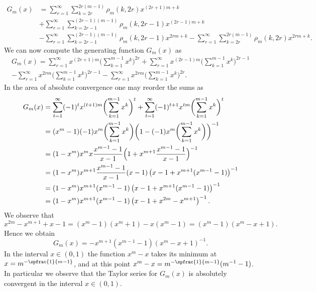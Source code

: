 \begin{equation*}
\begin{split}
G_m(x)&=\sum_{r=1}^{\infty} \sum_{k=2r}^{2r(m-1)}\rho_m(k,2r)x^{(2r+1)m+k}\\
&+ \sum_{r=1}^\infty\sum_{k=2r-1}^{(2r-1)(m-1)}\rho_m(k,2r-1)x^{(2r-1)m+k}\\
&-\sum_{r=1}^\infty \sum_{k=2r-1}^{(2r-1)(m-1)}\rho_m(k,2r-1)x^{2rm+k}-\sum_{r=1}^\infty\sum_{k=2r}^{2r(m-1)}\rho_m(k,2r)x^{2rm+k}.
\end{split}
\end{equation*}
We can now compute the generating function $G_m(x)$ as
\begin{multline*}
G_m(x)= \sum_{r=1}^{\infty} x^{(2r+1)m}\biggl(\sum_{k=1}^{m-1}x^k\biggr)^{2r}+ \sum_{r=1}^\infty x^{(2r-1)m}\biggl(\sum_{k=1}^{m-1}x^k\biggr)^{2r-1}\\
-\sum_{r=1}^\infty x^{2rm}\biggl(\sum_{k=1}^{m-1}x^k\biggr)^{2r-1} -\sum_{r=1}^\infty x^{2rm}\biggl(\sum_{k=1}^{m-1}x^k\biggr)^{2r}.
\end{multline*}
In the area of absolute convergence one may reorder the sums as
\begin{equation*}
\begin{split}
G_m(x)&=\sum_{t=1}^{\infty} (-1)^{t} x^{(t+1)m}\biggl(\sum_{k=1}^{m-1}x^k\biggr)^{t}+ \sum_{t=1}^{\infty} (-1)^{t+1} x^{tm}\biggl(\sum_{k=1}^{m-1}x^k\biggr)^{t}\\
&= (x^m-1)(-1)x^m\biggl(\sum_{k=1}^{m-1}x^k\biggr) \biggl(1- (-1)x^m\biggl(\sum_{k=1}^{m-1}x^k\biggr) \biggr)^{-1}\\
&= (1-x^m)x^mx \frac{x^{m-1}-1}{x-1}\Bigl(1+x^{m+1} \frac{x^{m-1}-1}{x-1}\Bigr)^{-1}\\
&= (1-x^m)x^{m+1} \frac{x^{m-1}-1}{x-1}(x-1)\left(x-1+x^{m+1} (x^{m-1}-1)\right)^{-1}\\
&= (1-x^m)x^{m+1} (x^{m-1}-1)\left(x-1+x^{m+1} (x^{m-1}-1)\right)^{-1}\\
&= (1-x^m)x^{m+1} (x^{m-1}-1)\left(x-1+x^{2m}-x^{m+1}\right)^{-1}.
\end{split}
\end{equation*}
We observe that
\[
x^{2m}-x^{m+1}+x-1= (x^m-1)(x^m +1)-x(x^m-1) = (x^m-1)(x^m-x+1).
\]
Hence we obtain
\[
G_m(x)=- x^{m+1} (x^{m-1}-1)\left(x^m-x+1\right)^{-1}.
\]
In the interval $x\in (0,1)$ the function $x^m-x$ takes its minimum at $x=m^{-\spfrac{1}{m-1}}$, and at this point $x^m-x=m^{-\spfrac{1}{m-1}}(m^{-1}-1)$. In particular we observe that the Taylor series for $G_m(x)$ is absolutely convergent in the interval $x\in (0,1)$.\par

